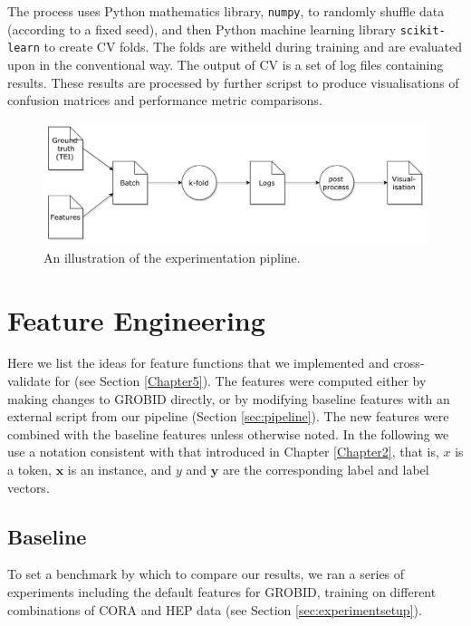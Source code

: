 The process uses Python mathematics library, \texttt{numpy}, to randomly shuffle data (according to a fixed seed), and then Python machine learning library \texttt{scikit-learn} to create CV folds. The folds are witheld during training and are evaluated upon in the conventional way. The output of CV is a set of log files containing results. These results are processed by further scripst to produce visualisations of confusion matrices and performance metric comparisons.

\begin{figure}[!ht]
\center
\includegraphics[width=\textwidth]{Figures/pipeline.pdf}
\caption{An illustration of the experimentation pipline.}
\label{fig:pipeline}
\end{figure}

\section{Feature Engineering}
\label{sec:featurengineering}

Here we list the ideas for feature functions that we implemented and cross-validate for (see Section \ref{Chapter5}). The features were computed either by making changes to GROBID directly, or by modifying baseline features with an external script from our pipeline (Section \ref{sec:pipeline}). The new features were combined with the baseline features unless otherwise noted. In the following we use a notation consistent with that introduced in Chapter \ref{Chapter2}, that is, $x$ is a token, $\mathbf{x}$ is an instance, and $y$ and $\textbf{y}$ are the corresponding label and label vectors.

\subsection{Baseline}

To set a benchmark by which to compare our results, we ran a series of experiments including the default features for GROBID, training on different combinations of CORA and HEP data (see Section \ref{sec:experimentsetup}).

